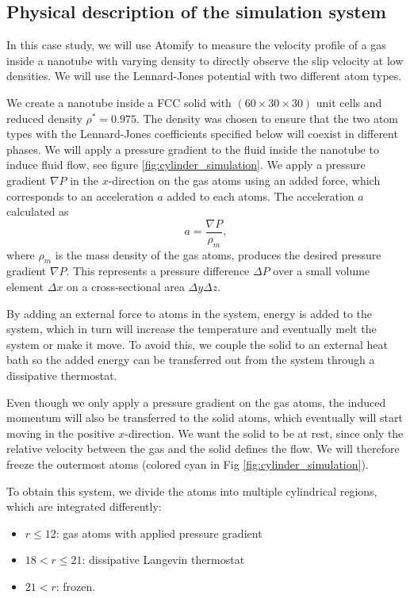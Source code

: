 \documentclass[12pt,a4paper,final]{iopart}
\begin{document}
\subsection{Physical description of the simulation system}
In this case study, we will use Atomify to measure the velocity profile of a
gas inside a nanotube with varying density to directly observe
the slip velocity at low densities.
We will use the Lennard-Jones potential with two different atom types.

We create a nanotube inside a FCC solid with $(60\times30\times30)$ unit cells and reduced density $\rho^* = 0.975$.
The density was chosen to ensure that the two atom types with the Lennard-Jones coefficients specified below will coexist in different phases. We will apply a pressure gradient to the fluid inside the nanotube to induce fluid flow, see figure \ref{fig:cylinder_simulation}.
We apply a pressure gradient $\nabla P$ in the $x$-direction on the gas atoms using an added force, which corresponds to an acceleration $a$ added to each atoms. The acceleration $a$ calculated as
\[
	a = \frac{\nabla P}{\rho_m},
\]
where $\rho_m$ is the mass density of the gas atoms, produces the desired pressure gradient $\nabla P$.
This represents a pressure difference $\Delta P$ over a small volume element $\Delta x$ on a cross-sectional area $\Delta y\Delta z$.

By adding an external force to atoms in the system, energy is added to the system, which in turn will increase the temperature and eventually melt the system or make it move.
To avoid this, we couple the solid to an external heat bath so the added energy can be transferred out from the system through a dissipative thermostat.

Even though we only apply a pressure gradient on the gas atoms, the induced momentum will also be transferred
to the solid atoms, which eventually will start moving in the positive $x$-direction.
We want the solid to be at rest, since only the relative velocity between the gas and the solid defines
the flow. We will therefore freeze the outermost atoms (colored cyan in Fig \ref{fig:cylinder_simulation}).

To obtain this system, we divide the atoms into multiple cylindrical regions, which are integrated differently:

\begin{itemize}
	\item $r \leq 12$: gas atoms with applied pressure gradient
	\item $18 < r \leq 21$: dissipative Langevin thermostat
	\item $21 < r$: frozen.
\end{itemize}
\end{document}
